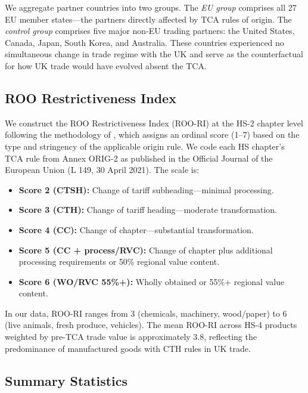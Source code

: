 \documentclass[12pt]{article}
\begin{document}
We aggregate partner countries into two groups. The \textit{EU group} comprises all 27 EU member states---the partners directly affected by TCA rules of origin. The \textit{control group} comprises five major non-EU trading partners: the United States, Canada, Japan, South Korea, and Australia. These countries experienced no simultaneous change in trade regime with the UK and serve as the counterfactual for how UK trade would have evolved absent the TCA.

\subsection{ROO Restrictiveness Index}

We construct the ROO Restrictiveness Index (ROO-RI) at the HS-2 chapter level following the methodology of \citet{estevadeordal2000}, which assigns an ordinal score (1--7) based on the type and stringency of the applicable origin rule. We code each HS chapter's TCA rule from Annex ORIG-2 as published in the Official Journal of the European Union (L 149, 30 April 2021). The scale is:

\begin{itemize}
  \item \textbf{Score 2 (CTSH):} Change of tariff subheading---minimal processing.
  \item \textbf{Score 3 (CTH):} Change of tariff heading---moderate transformation.
  \item \textbf{Score 4 (CC):} Change of chapter---substantial transformation.
  \item \textbf{Score 5 (CC + process/RVC):} Change of chapter plus additional processing requirements or 50\% regional value content.
  \item \textbf{Score 6 (WO/RVC 55\%+):} Wholly obtained or 55\%+ regional value content.
\end{itemize}

In our data, ROO-RI ranges from 3 (chemicals, machinery, wood/paper) to 6 (live animals, fresh produce, vehicles). The mean ROO-RI across HS-4 products weighted by pre-TCA trade value is approximately 3.8, reflecting the predominance of manufactured goods with CTH rules in UK trade.

\subsection{Summary Statistics}


\end{document}
